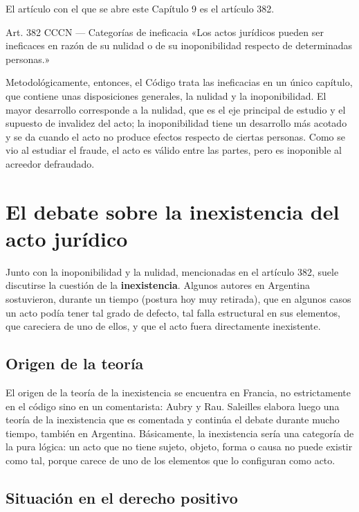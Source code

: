 \documentclass[12pt,oneside]{book}
\begin{document}
El artículo con el que se abre este Capítulo 9 es el artículo 382.

\begin{articulo}{Art. 382 CCCN --- Categorías de ineficacia}
«Los actos jurídicos pueden ser ineficaces en razón de su nulidad o de su inoponibilidad respecto de determinadas personas.»
\end{articulo}

Metodológicamente, entonces, el Código trata las ineficacias en un único capítulo, que contiene unas disposiciones generales, la nulidad y la inoponibilidad. El mayor desarrollo corresponde a la nulidad, que es el eje principal de estudio y el supuesto de invalidez del acto; la inoponibilidad tiene un desarrollo más acotado y se da cuando el acto no produce efectos respecto de ciertas personas. Como se vio al estudiar el fraude, el acto es válido entre las partes, pero es inoponible al acreedor defraudado.

\section{El debate sobre la inexistencia del acto jurídico}
\label{sec:inexistencia}

Junto con la inoponibilidad y la nulidad, mencionadas en el artículo 382, suele discutirse la cuestión de la \textbf{inexistencia}. Algunos autores en Argentina sostuvieron, durante un tiempo (postura hoy muy retirada), que en algunos casos un acto podía tener tal grado de defecto, tal falla estructural en sus elementos, que careciera de uno de ellos, y que el acto fuera directamente inexistente.

\subsection*{Origen de la teoría}

El origen de la teoría de la inexistencia se encuentra en Francia, no estrictamente en el código sino en un comentarista: Aubry y Rau. Saleilles elabora luego una teoría de la inexistencia que es comentada y continúa el debate durante mucho tiempo, también en Argentina. Básicamente, la inexistencia sería una categoría de la pura lógica: un acto que no tiene sujeto, objeto, forma o causa no puede existir como tal, porque carece de uno de los elementos que lo configuran como acto.

\subsection*{Situación en el derecho positivo}
\end{document}
